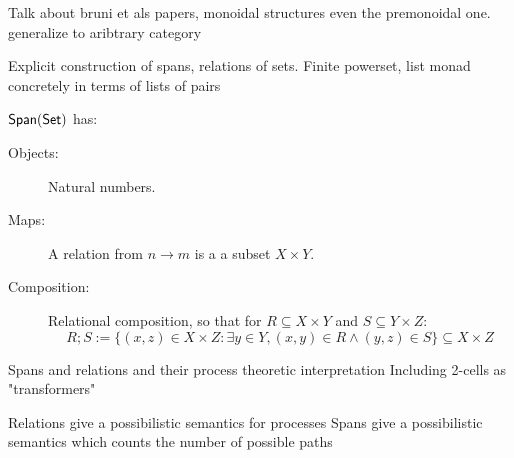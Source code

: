  Talk about bruni et als papers, monoidal structures even the premonoidal one. generalize to aribtrary category



Explicit construction of spans, relations of sets.  Finite powerset, list monad concretely in terms of lists of pairs

\begin{example}
$\mathsf{Span}(\mathsf{Set})$ has:

\begin{description}
\item[Objects:] Natural numbers.

\item[Maps:] A relation from $n\to m$ is a a subset $X \times Y$.

\item[Composition:] Relational composition, so that for $R \subseteq X \times Y$  and $S \subseteq Y \times Z$:
$$
R;S := \{  (x,z) \in X\times Z: \exists y \in Y, (x,y) \in R \wedge (y,z) \in S \} \subseteq X\times Z
$$ 
\end{description}

\end{example}

Spans and relations and their process theoretic interpretation
Including 2-cells as "transformers"

Relations give a possibilistic semantics for processes
Spans give a possibilistic semantics which counts the number of possible paths





